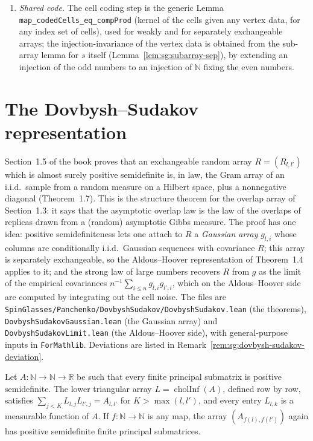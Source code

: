 \begin{remark}
\begin{enumerate}
\item \emph{Shared code.} The cell coding step is the generic Lemma \texttt{map\_codedCells\_eq\_compProd} (kernel of the cells given any vertex data, for any index set of cells), used for weakly and for separately exchangeable arrays; the injection-invariance of the vertex data is obtained from the sub-array lemma for $s$ itself (Lemma~\ref{lem:sg:subarray-sep}), by extending an injection of the odd numbers to an injection of $\mathbb N$ fixing the even numbers.
\end{enumerate}
\end{remark}

\section{The Dovbysh--Sudakov representation}\label{sec:sg:dovbysh-sudakov}

Section~1.5 of the book proves that an exchangeable random array $R=(R_{l,l'})$ which is almost surely positive semidefinite is, in law, the Gram array of an i.i.d.\ sample from a random measure on a Hilbert space, plus a nonnegative diagonal (Theorem~1.7).
This is the structure theorem for the overlap array of Section~1.3: it says that the asymptotic overlap law is the law of the overlaps of replicas drawn from a (random) asymptotic Gibbs measure.
The proof has one idea: positive semidefiniteness lets one attach to $R$ a \emph{Gaussian array} $g_{l,i}$ whose columns are conditionally i.i.d.\ Gaussian sequences with covariance $R$; this array is separately exchangeable, so the Aldous--Hoover representation of Theorem~1.4 applies to it; and the strong law of large numbers recovers $R$ from $g$ as the limit of the empirical covariances $n^{-1}\sum_{i\le n}g_{l,i}g_{l',i}$, which on the Aldous--Hoover side are computed by integrating out the cell noise.
The files are \texttt{SpinGlasses/Panchenko/DovbyshSudakov/DovbyshSudakov.lean} (the theorems), \texttt{DovbyshSudakovGaussian.lean} (the Gaussian array) and \texttt{DovbyshSudakovLimit.lean} (the Aldous--Hoover side), with general-purpose inputs in \texttt{ForMathlib}.
Deviations are listed in Remark~\ref{rem:sg:dovbysh-sudakov-deviation}.

\begin{lemma}\label{lem:sg:cholesky}
  \leanok
Let $A:\mathbb N\to\mathbb N\to\mathbb R$ be such that every finite principal submatrix is positive semidefinite. The lower triangular array $L=\operatorname{cholInf}(A)$, defined row by row, satisfies $\sum_{j<K}L_{l,j}L_{l',j}=A_{l,l'}$ for $K>\max(l,l')$, and every entry $L_{l,k}$ is a measurable function of $A$. If $f:\mathbb N\to\mathbb N$ is any map, the array $(A_{f(l),f(l')})$ again has positive semidefinite finite principal submatrices.
\end{lemma}

